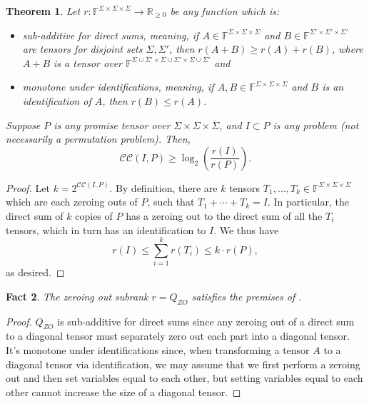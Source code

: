 \documentclass[10pt,a4paper]{article}
\newtheorem{theorem}{Theorem}
\newtheorem{fact}[theorem]{Fact}
\newcommand{\F}{\mathbb{F}}
\newcommand{\cc}{\mathcal{CC}}
\begin{document}
\begin{theorem} \label{thm:asymptspectrum}
Let $r : \F^{\Sigma \times \Sigma \times \Sigma} \to \mathbb{R}_{\geq 0}$ be any function which is:
\begin{itemize}
    \item \emph{sub-additive for direct sums}, meaning, if $A \in \F^{\Sigma \times \Sigma \times \Sigma}$ and $B \in \F^{\Sigma' \times \Sigma' \times \Sigma'}$ are tensors for disjoint sets $\Sigma, \Sigma'$, then $r(A+B) \geq r(A) + r(B)$, where $A+B$ is a tensor over $\F^{\Sigma \cup \Sigma' \times \Sigma \cup \Sigma' \times \Sigma \cup \Sigma'}$ and
    \item \emph{monotone under identifications}, meaning, if  $A,B \in \F^{\Sigma \times \Sigma \times \Sigma}$ and $B$ is an identification of $A$, then $r(B) \leq r(A)$.
\end{itemize}

Suppose $P$ is any promise tensor over $\Sigma \times \Sigma \times \Sigma$, and $I \subset P$ is any problem (not necessarily a permutation problem). Then, $$\cc(I,P) \geq \log_2\left( \frac{r(I)}{r(P)} \right).$$
\end{theorem}

\begin{proof}
   Let $k = 2^{\cc(I,P)}$. By definition, there are $k$ tensors $T_1, \ldots, T_k \in \F^{\Sigma \times \Sigma \times \Sigma}$ which are each zeroing outs of $P$, such that $T_1 + \cdots + T_k = I$. In particular, the direct sum of $k$ copies of $P$ has a zeroing out to the direct sum of all the $T_i$ tensors, which in turn has an identification to $I$. We thus have $$r(I) \leq \sum_{i=1}^k r(T_i) \leq k \cdot r(P),$$
    as desired.
\end{proof}

\begin{fact}
    The zeroing out subrank $r = Q_{ZO}$ satisfies the premises of .
\end{fact}

\begin{proof}
    $Q_{ZO}$ is sub-additive for direct sums since any zeroing out of a direct sum to a diagonal tensor must separately zero out each part into a diagonal tensor. It's monotone under identifications since, when transforming a tensor $A$ to a diagonal tensor via identification, we may assume that we first perform a zeroing out and then set variables equal to each other, but setting variables equal to each other cannot increase the size of a diagonal tensor.
\end{proof}
\end{document}
